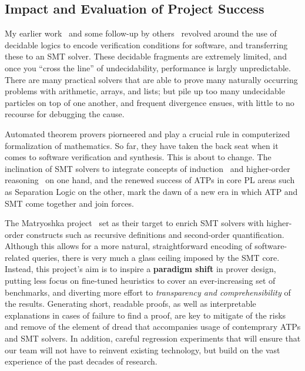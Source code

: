 \subsection{Impact and Evaluation of Project Success}

My earlier work~\cite{CAV2013,POPL2014,CAV2014,PLDI2014,ICDT2017} and some follow-up by others~\cite{OOPSLA2017:Padon,VMCAI2017:Frumkin,PLDI2018:Taube,CAV2019:Berkovits,CAV2019:Feldman} revolved around the use of decidable logics to encode verification conditions for software,
and transferring these to an SMT solver.
These decidable fragments are extremely limited, and once you ``cross the line'' of undecidability, performance is largly unpredictable.
There are many practical solvers that are able to prove many naturally occurring problems with arithmetic, arrays, and lists;
but pile up too many undecidable particles on top of one another, and frequent divergence ensues, with little to no recourse for debugging the cause.

Automated theorem provers piorneered and play a crucial rule in computerized formalization of mathematics.
So far, they have taken the back seat when it comes to software verification and synthesis.
This is about to change.
The inclination of SMT solvers to integrate concepts of induction~\cite{VMCAI2015:Reynolds} and higher-order reasoning~\cite{smt-from-matryoshka} on one hand,
and the renewed success of ATPs in core PL areas such as Separation Logic on the other,
mark the dawn of a new era in which ATP and SMT come together and join forces.

The Matryoshka project~\cite{what} set as their target to enrich SMT solvers with higher-order constructs such as recursive definitions and second-order quantification.
Although this allows for a more natural, straightforward encoding of software-related queries, there is very much a glass ceiling imposed by the SMT core.
Instead, this project's aim is to inspire a \textbf{paradigm shift} in prover design, putting less focus on fine-tuned heuristics to cover an ever-increasing set of benchmarks, and diverting more effort to \emph{transparency and comprehensibility} of the results.
Generating short, readable proofs, as well as interpretable explanations in cases of failure to find a proof,
are key to mitigate of the risks and remove of the element of dread that accompanies usage of contemprary ATPs and SMT solvers.
In addition, careful regression experiments that will ensure that our team will not have to reinvent existing technology, but build on the vast experience of the past decades of research.
